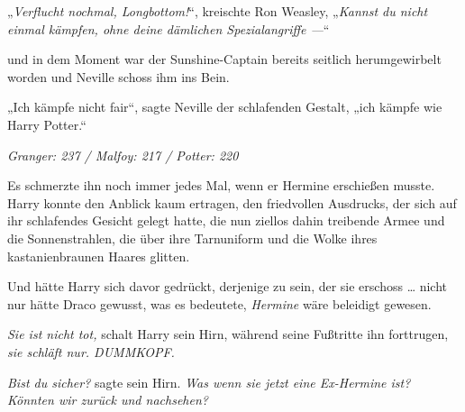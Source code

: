 „\emph{Verflucht nochmal, Longbottom!}“, kreischte Ron Weasley,
„\emph{Kannst du nicht einmal kämpfen, ohne deine dämlichen Spezialangriffe —}“

und in dem Moment war der Sunshine-Captain bereits seitlich herumgewirbelt worden und Neville schoss ihm ins Bein.

„Ich kämpfe nicht fair“, sagte Neville der schlafenden Gestalt, „ich kämpfe wie Harry Potter.“

\later

\emph{Granger: 237 / Malfoy: 217 / Potter: 220}

Es schmerzte ihn noch immer jedes Mal, wenn er Hermine erschießen musste. Harry konnte den Anblick kaum ertragen, den friedvollen Ausdrucks, der sich auf ihr schlafendes Gesicht gelegt hatte, die nun ziellos dahin treibende Armee und die Sonnenstrahlen, die über ihre Tarnuniform und die Wolke ihres kastanienbraunen Haares glitten.

Und hätte Harry sich davor gedrückt, derjenige zu sein, der sie erschoss … nicht nur hätte Draco gewusst, was es bedeutete, \emph{Hermine} wäre beleidigt gewesen.

\emph{Sie ist nicht tot,} schalt Harry sein Hirn, während seine Fußtritte ihn forttrugen, \emph{sie schläft nur. DUMMKOPF.}

\emph{Bist du sicher?} sagte sein Hirn. \emph{Was wenn sie jetzt eine Ex-Hermine ist? Könnten wir zurück und nachsehen?}%

